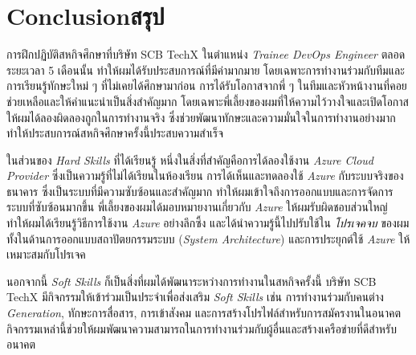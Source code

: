 \chapter{\ifenglish Conclusion\else สรุป\fi}

การฝึกปฏิบัติสหกิจศึกษาที่บริษัท SCB TechX ในตำแหน่ง \textit{Trainee DevOps Engineer} ตลอดระยะเวลา 5 เดือนนั้น ทำให้ผมได้รับประสบการณ์ที่มีค่ามากมาย โดยเฉพาะการทำงานร่วมกับทีมและการเรียนรู้ทักษะใหม่ ๆ ที่ไม่เคยได้ศึกษามาก่อน การได้รับโอกาสจากพี่ ๆ ในทีมและหัวหน้างานที่คอยช่วยเหลือและให้คำแนะนำเป็นสิ่งสำคัญมาก โดยเฉพาะพี่เลี้ยงของผมที่ให้ความไว้วางใจและเปิดโอกาสให้ผมได้ลองผิดลองถูกในการทำงานจริง ซึ่งช่วยพัฒนาทักษะและความมั่นใจในการทำงานอย่างมาก ทำให้ประสบการณ์สหกิจศึกษาครั้งนี้ประสบความสำเร็จ

ในส่วนของ \textit{Hard Skills} ที่ได้เรียนรู้ หนึ่งในสิ่งที่สำคัญคือการได้ลองใช้งาน \textit{Azure Cloud Provider} ซึ่งเป็นความรู้ที่ไม่ได้เรียนในห้องเรียน การได้เห็นและทดลองใช้ \textit{Azure} กับระบบจริงของธนาคาร ซึ่งเป็นระบบที่มีความซับซ้อนและสำคัญมาก ทำให้ผมเข้าใจถึงการออกแบบและการจัดการระบบที่ซับซ้อนมากขึ้น พี่เลี้ยงของผมได้มอบหมายงานเกี่ยวกับ \textit{Azure} ให้ผมรับผิดชอบส่วนใหญ่ ทำให้ผมได้เรียนรู้วิธีการใช้งาน \textit{Azure} อย่างลึกซึ้ง และได้นำความรู้นี้ไปปรับใช้ใน \textit{โปรเจคจบ} ของผม ทั้งในด้านการออกแบบสถาปัตยกรรมระบบ (\textit{System Architecture}) และการประยุกต์ใช้ \textit{Azure} ให้เหมาะสมกับโปรเจค

นอกจากนี้ \textit{Soft Skills} ก็เป็นสิ่งที่ผมได้พัฒนาระหว่างการทำงานในสหกิจครั้งนี้ บริษัท SCB TechX มีกิจกรรมให้เข้าร่วมเป็นประจำเพื่อส่งเสริม \textit{Soft Skills} เช่น การทำงานร่วมกับคนต่าง \textit{Generation}, ทักษะการสื่อสาร, การเข้าสังคม และการสร้างโปรไฟล์สำหรับการสมัครงานในอนาคต กิจกรรมเหล่านี้ช่วยให้ผมพัฒนาความสามารถในการทำงานร่วมกับผู้อื่นและสร้างเครือข่ายที่ดีสำหรับอนาคต
